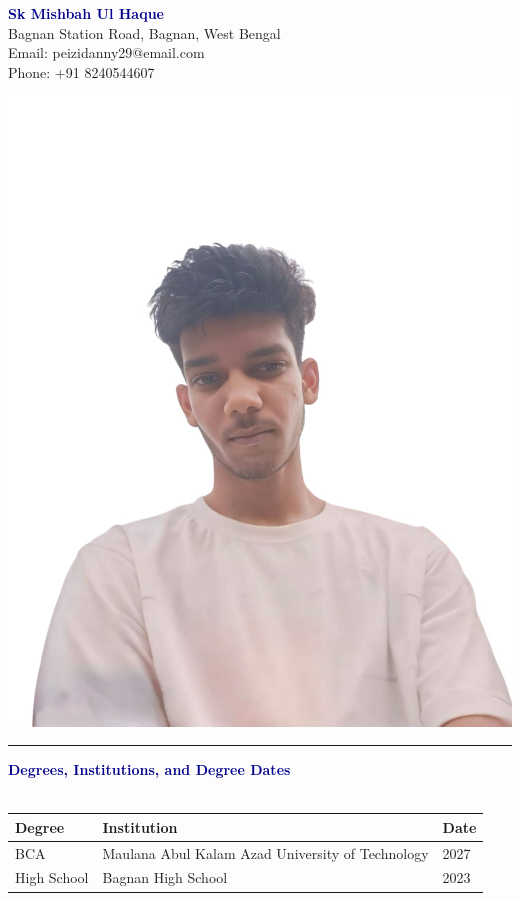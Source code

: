 \documentclass[a4paper,10pt]{article}
\newcommand{\sectionbreak}{\vspace{1em}}
\newcommand{\customrule}{\color{darkblue}\hrule height 1.2pt}
\begin{document}
\begin{minipage}{0.75\textwidth}
    \begin{flushleft}
        {\textcolor{darkblue}{\textbf{\Huge Sk Mishbah Ul Haque}}} \\
        Bagnan Station Road, Bagnan, West Bengal \\
        Email: peizidanny29@email.com \\
        Phone: +91 8240544607
    \end{flushleft}
\end{minipage}
\hfill
\begin{minipage}{0.20\textwidth}
    \includegraphics[width=0.9\linewidth]{WhatsApp Image 2024-09-23 at 12.08.34.jpeg} 
\end{minipage}

\sectionbreak
\customrule
\sectionbreak

\textcolor{darkblue}{\textbf{\large Degrees, Institutions, and Degree Dates}} \\
\\
\begin{tabular}{|p{4cm}|p{5cm}|p{3cm}|}
    \hline
    \textbf{Degree} & \textbf{Institution} & \textbf{Date} \\
    \hline
    BCA & Maulana Abul Kalam Azad University of Technology & 2027 \\
    \hline
    High School & Bagnan High School & 2023 \\
    \hline
\end{tabular}
\end{document}
